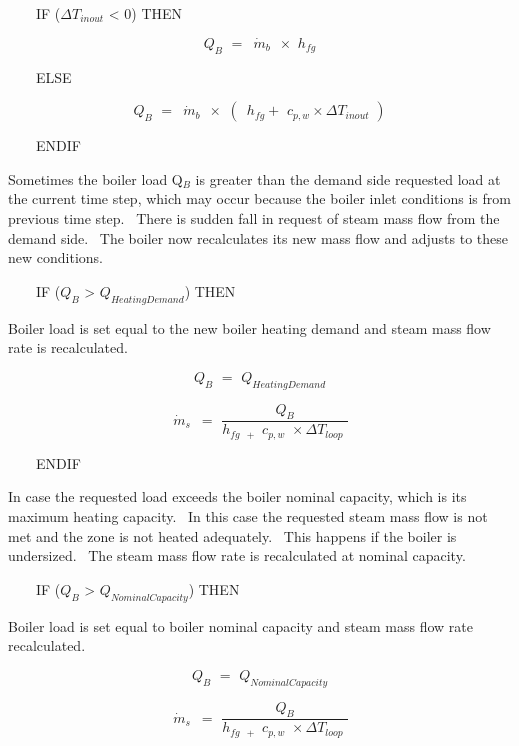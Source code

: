 ~~~~IF (\(\Delta {T_{inout}}\) < 0) THEN

\begin{equation}
{Q_B}\,\, = \,\,\,{\dot m_b}\,\,\, \times \,\,{h_{fg}}
\end{equation}

~~~~ELSE

\begin{equation}
{Q_B}\,\, = \,\,\,{\dot m_b}\,\,\, \times \,\,(\,\,\,{h_{fg}} + \,\,{c_{p,w}} \times \Delta {T_{inout}}\,\,)
\end{equation}

~~~~ENDIF

Sometimes the boiler load Q\(_{B}\) is greater than the demand side requested load at the current time step, which may occur because the boiler inlet conditions is from previous time step.~ There is sudden fall in request of steam mass flow from the demand side.~ The boiler now recalculates its new mass flow and adjusts to these new conditions.

~~~~IF (\({Q_B}\) > \({Q_{HeatingDemand}}\)) THEN

Boiler load is set equal to the new boiler heating demand and steam mass flow rate is recalculated.

\begin{equation}
{Q_B}\,\, = \,\,{Q_{HeatingDemand}}
\end{equation}

\begin{equation}
\,{\dot m_s}\,\,\, = \,\,\frac{{{Q_B}}}{{{h_{fg\,\,\, + }}\,\,{c_{p,w}}\,\, \times \Delta {T_{loop}}\,\,}}
\end{equation}

~~~~ENDIF

In case the requested load exceeds the boiler nominal capacity, which is its maximum heating capacity.~ In this case the requested steam mass flow is not met and the zone is not heated adequately.~ This happens if the boiler is undersized.~ The steam mass flow rate is recalculated at nominal capacity.

~~~~IF (\({Q_B}\) > \({Q_{NominalCapacity}}\)) THEN

Boiler load is set equal to boiler nominal capacity and steam mass flow rate recalculated.

\begin{equation}
{Q_B}\,\, = \,\,{Q_{NominalCapacity}}
\end{equation}

\begin{equation}
\,{\dot m_s}\,\,\, = \,\,\frac{{{Q_B}}}{{{h_{fg\,\,\, + }}\,\,{c_{p,w}}\,\, \times \Delta {T_{loop}}\,\,}}
\end{equation}


